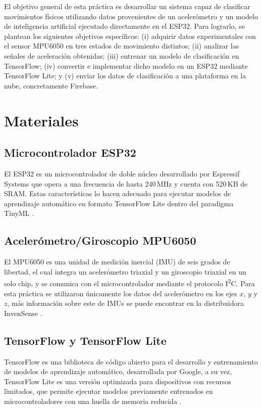 \documentclass[conference]{IEEEtran}
\begin{document}
El objetivo general de esta práctica es desarrollar un sistema capaz de clasificar movimientos físicos utilizando datos provenientes de un acelerómetro y un modelo de inteligencia artificial ejecutado directamente en el ESP32. Para lograrlo, se plantean los siguientes objetivos específicos: (i) adquirir datos experimentales con el sensor MPU6050 en tres estados de movimiento distintos; (ii) analizar las señales de aceleración obtenidas; (iii) entrenar un modelo de clasificación en TensorFlow; (iv) convertir e implementar dicho modelo en un ESP32 mediante TensorFlow Lite; y (v) enviar los datos de clasificación a una plataforma en la nube, concretamente Firebase.

\section{Materiales}

\subsection{Microcontrolador ESP32}
El ESP32 es un microcontrolador de doble núcleo desarrollado por Espressif Systems que opera a una frecuencia de hasta 240\,MHz y cuenta con 520\,KB de SRAM. Estas características lo hacen adecuado para ejecutar modelos de aprendizaje automático en formato TensorFlow Lite dentro del paradigma TinyML \cite{espressif2023}.

\subsection{Acelerómetro/Giroscopio MPU6050}
El MPU6050 es una unidad de medición inercial (IMU) de seis grados de libertad, el cual integra un acelerómetro triaxial y un giroscopio triaxial en un solo chip, y se comunica con el microcontrolador mediante el protocolo I\textsuperscript{2}C. Para esta práctica se utilizaron únicamente los datos del acelerómetro en los ejes $x$, $y$ y $z$, más información sobre este de IMUs se puede encontrar en la distribuidora InvenSense \cite{invensense2013}.

\subsection{TensorFlow y TensorFlow Lite}
TensorFlow es una biblioteca de código abierto para el desarrollo y entrenamiento de modelos de aprendizaje automático, desarrollada por Google, a su vez, TensorFlow Lite es una versión optimizada para dispositivos con recursos limitados, que permite ejecutar modelos previamente entrenados en microcontroladores con una huella de memoria reducida \cite{tensorflow2023}.
\end{document}
